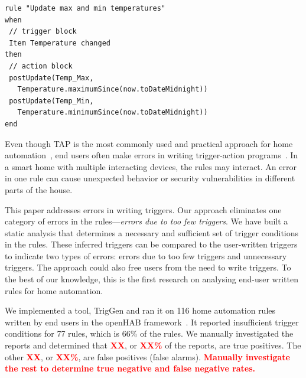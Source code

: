 \documentclass{sig-alternate-05-2015}
\newcommand\todo[1]{\textbf{\textcolor{red}{#1}}}
\begin{document}
\begin{lstlisting}[caption={A rule that updates the maximum and minimum temperature values for a day---it compares the current temperature with the values starting from midnight of the respective day. },label={lst:rule}]
rule "Update max and min temperatures"
when
 // trigger block	
 Item Temperature changed
then	
 // action block 
 postUpdate(Temp_Max, 
   Temperature.maximumSince(now.toDateMidnight))
 postUpdate(Temp_Min, 
   Temperature.minimumSince(now.toDateMidnight))
end
\end{lstlisting}

Even though TAP is the most commonly used and practical approach for home
automation~\cite{practical-tap, dey}, end users often make errors in writing
trigger-action programs~\cite{Huang,wild-tap}.  In a smart home with
multiple interacting devices, the rules may interact.  An error in one rule
can cause unexpected behavior or security vulnerabilities in different
parts of the house.

This paper addresses errors in writing triggers.  Our approach eliminates
one category of errors in the rules---\textit{errors due to too few triggers}. We have built a static analysis that determines 
a necessary and sufficient set
of trigger conditions in the rules.  These inferred triggers can be
compared to the user-written triggers to indicate two types of errors:
errors due to too few triggers and unnecessary triggers.  The approach
could also free users from the need to write triggers. 
To the best of our knowledge, this is the first research on analysing
end-user written rules for home automation.

We implemented a tool, TrigGen and ran it on 116 home automation rules 
written by end users in the openHAB framework~\cite{openhab}.  It reported
insufficient trigger conditions for 77 rules, which is 66\%
of the rules.  We manually investigated the reports and determined
that \todo{XX}, or \todo{XX\%} of the reports, are true positives.  The other 
\todo{XX}, or \todo{XX\%}, are false positives (false alarms).
\todo{Manually investigate the rest to determine true negative and false
  negative rates.}
\end{document}

